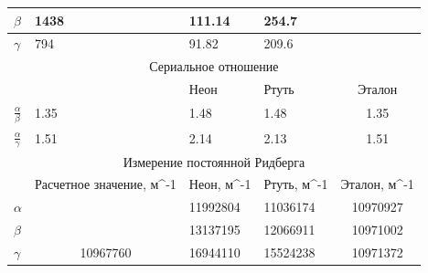 \documentclass[%
 reprint,
 amsmath,amssymb,
 aps,
]{revtex4-2}
\begin{document}
\begin{table}[]
\begin{tabular}{|l|l|l|l|l|l|}
		$\beta$                   & 1438                                            & 111.14                      & 254.7                        &                              &                                 \\ \hline
		$\gamma$                   & 794                                             & 91.82                       & 209.6                        &                              &                                 \\ \hline
		\multicolumn{6}{|c|}{{\color[HTML]{FF0000} Сериальное отношение}}                                                                                                                                   \\ \hline
		&                                                 & Неон                        & Ртуть                        & \multicolumn{2}{c|}{Эталон}                                    \\ \hline
		$\frac{\alpha}{\beta}$                 & 1.35                                            & 1.48                        & 1.48                         & \multicolumn{2}{c|}{1.35}                                      \\ \hline
		$\frac{\alpha}{\gamma}$                   & 1.51                                            & 2.14                        & 2.13                         & \multicolumn{2}{c|}{1.51}                                      \\ \hline
		\multicolumn{6}{|c|}{{\color[HTML]{FF0000} Измерение постоянной   Ридберга}}                                                                                                                        \\ \hline
		& Расчетное значение, м\textasciicircum{}-1       & Неон, м\textasciicircum{}-1 & Ртуть, м\textasciicircum{}-1 & \multicolumn{2}{c|}{Эталон, м\textasciicircum{}-1}             \\ \hline
		$\alpha$                   & \multicolumn{1}{c|}{}                           & 11992804                    & 11036174                     & \multicolumn{2}{c|}{10970927}                                  \\ \cline{1-1} \cline{3-6} 
		$\beta$                   & \multicolumn{1}{c|}{}                           & 13137195                    & 12066911                     & \multicolumn{2}{c|}{10971002}                                  \\ \cline{1-1} \cline{3-6} 
		$\gamma$                   & \multicolumn{1}{c|}{\multirow{-3}{*}{10967760}} & 16944110                    & 15524238                     & \multicolumn{2}{c|}{10971372}                                  \\ \hline

\end{tabular}
\end{table}
\end{document}
